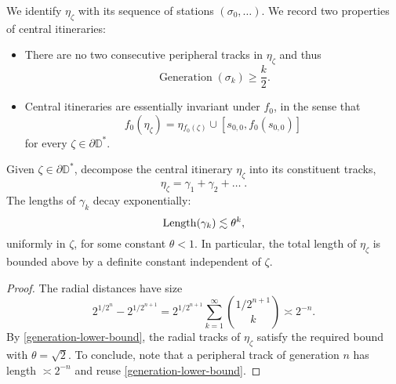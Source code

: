 

We identify $\eta_{\zeta}$ with its sequence of stations $(\sigma_0,\ldots)$. We record two properties of central itineraries:

\begin{itemize}
	\item There are no two consecutive peripheral tracks in $\eta_{\zeta}$ and thus
	\begin{equation} \label{generation-lower-bound}
		\operatorname{Generation}(\sigma_k)\geq \frac k2.
	\end{equation}
	
	\item Central itineraries are essentially invariant under $f_{0}$, in the sense that
	\begin{equation*}
		f_{0}(\eta_{\zeta})=\eta{}_{f_{0}(\zeta)}\cup[s_{0,0},f_0(s_{0,0})]
	\end{equation*}
	for every $\zeta\in \partial \mathbb D^*$.
\end{itemize}

\begin{lemma} \label{track_decay}
Given $\zeta\in \partial \mathbb D^*$, decompose the central itinerary $\eta_{\zeta}$ into its constituent tracks, 
$$\eta_{\zeta}=\gamma _1 + \gamma_2 + \dots \; .$$ 
	The lengths of $\gamma_k$ decay exponentially:
	$$\operatorname{Length}(\gamma_{k})\lesssim \theta^{k},$$ uniformly in $\zeta$, for some constant $\theta<1$.
In particular, the total length of $\eta_\zeta$ is bounded above by a definite constant independent of $\zeta$.
\end{lemma}
\begin{proof}
	The radial distances have size 
	$$2^{1/2^n}-2^{1/2^{n+1}} = 2^{1/2^{n+1}} \sum_{k=1}^{\infty} \binom{1/2^{n+1}}{k} \asymp 2^{-n}.$$
	By \eqref{generation-lower-bound}, the radial tracks of $\eta_\zeta$ satisfy the required bound with $\theta = \sqrt 2$. To conclude, note that a peripheral track of generation $n$ has length $\asymp 2^{-n}$ and reuse \eqref{generation-lower-bound}.
\end{proof}



